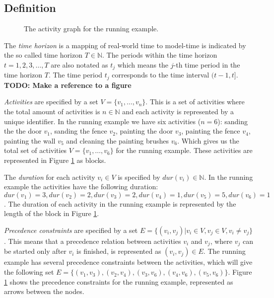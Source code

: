 \documentclass{article}
\theoremstyle{definition}
\newcommand{\TODO}[1]{{\color{red}\textbf{TODO: #1}}}
\newcommand{\dur}[1]{\ensuremath{dur(v_{#1})}} %
\begin{document}
\subsection{Definition}
\label{text:definitions}

\begin{figure}[h]
	\centering
	
	\caption{The activity graph for the running example. }
	\label{fig:activity_graph}
\end{figure}

The \emph{time horizon} is a mapping of real-world time to model-time is indicated by the so called time horizon $T \in \mathbb{N}$.
The periods within the time horizon $t=1,2,3,\ldots,T$ are also notated as $t_j$ which means the $j$-th time period in the time horizon $T$. 
The time period $t_j$ corresponds to the time interval $(t-1,t]$. 
\TODO{Make a reference to a figure}

\emph{Activities} are specified by a set $V = \{v_1, \ldots, v_n\}$.
This is a set of activities where the total amount of activities is $n \in \mathbb{N}$ and each activity is represented by a unique identifier. %
In the running example we have six activities ($n = 6$): sanding the the door $v_1$, sanding the fence $v_2$,  painting the door $v_3$, painting the fence $v_4$, painting the wall $v_5$ and cleaning the painting brushes $v_6$.
Which gives us the total set of activities $V = \{v_1, \ldots, v_6\}$ for the running example.
These activities are represented in Figure \ref{fig:activity_graph} as blocks.

The \emph{duration} for each activity $v_i \in V$ is specified by $\dur{i} \in \mathbb{N}$.
In the running example the activities have the following duration: $\dur{1} = 3, \dur{2} = 2, \dur{3} = 2, \dur{4} = 1, \dur{5} = 5, \dur{6} = 1$.
The duration of each activity in the running example is represented by the length of the block in Figure \ref{fig:activity_graph}.

\emph{Precedence constraints} are specified by a set $E = \{(v_i, v_j) | v_i \in V, v_j \in V, v_i \neq v_j\}$.
This means that a precedence relation between activities $v_i$ and $v_j$, where $v_j$ can be started only after $v_i$ is finished, is represented as $(v_i, v_j) \in E$.
The running example has several precedence constraints between the activities, which will give the following set $E = \{(v_1, v_3), (v_2, v_4), (v_3, v_6), (v_4, v_6), (v_5, v_6)\}$.
Figure \ref{fig:activity_graph} shows the precedence constraints for the running example, represented as arrows between the nodes.
\end{document}
